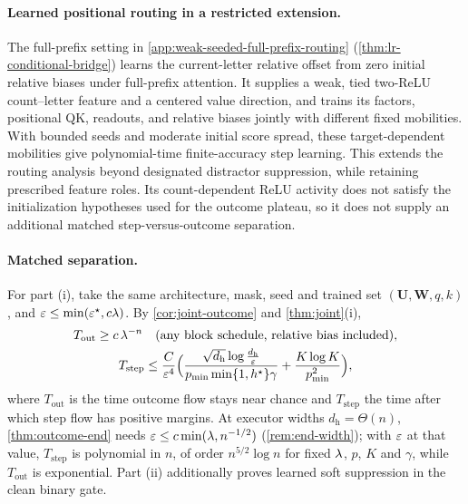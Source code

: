 \paragraph{Learned positional routing in a restricted extension.}
The full-prefix setting in \cref{app:weak-seeded-full-prefix-routing}
(\cref{thm:lr-conditional-bridge}) learns the current-letter
relative offset from zero initial relative biases under full-prefix attention. It supplies a weak,
tied two-ReLU count--letter feature and a centered value direction, and trains its factors,
positional QK, readouts, and relative biases jointly with different fixed mobilities. With bounded
seeds and moderate initial score spread, these target-dependent mobilities give polynomial-time
finite-accuracy step learning. This extends the routing analysis beyond designated distractor
suppression, while retaining prescribed feature roles. Its count-dependent ReLU activity does
not satisfy the initialization hypotheses used for the outcome plateau, so it does not supply
an additional matched step-versus-outcome separation.

\paragraph{Matched separation.} For part (i), take the same architecture, mask, seed and trained set $(\mathbf U,\mathbf W,q,k)$, and $\varepsilon\le\min(\varepsilon^\star,c\lambda)$.
By \cref{cor:joint-outcome} and \cref{thm:joint}(i),
\begin{gather*}
 T_{\mathrm{out}}\ge c\,\lambda^{-n}\quad\text{(any block schedule, relative bias included)},\\
 T_{\mathrm{step}}\le\frac{C}{\varepsilon^4}\Bigl(\frac{\sqrt{d_{\mathrm h}}\log\frac{d_{\mathrm h}}{\varepsilon}}{p_{\min}\min\{1,h^\star\}\gamma}+\frac{K\log K}{p_{\min}^2}\Bigr),
\end{gather*}
where $T_{\mathrm{out}}$ is the time outcome flow stays near chance and $T_{\mathrm{step}}$ the time after which step flow has positive margins. At executor
widths $d_{\mathrm h}=\Theta(n)$, \cref{thm:outcome-end} needs $\varepsilon\le c\min(\lambda,n^{-1/2})$ (\cref{rem:end-width}); with $\varepsilon$ at that value, $T_{\mathrm{step}}$ is polynomial
in $n$, of order $n^{5/2}\log n$ for fixed $\lambda$, $p$, $K$ and $\gamma$, while $T_{\mathrm{out}}$ is exponential. Part (ii) additionally proves learned soft suppression in the clean binary gate.

\suppressfloats[t]
